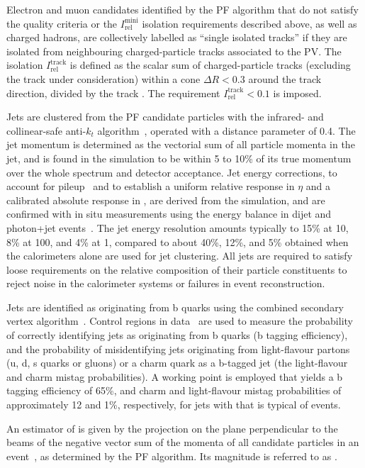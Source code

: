 Electron and muon candidates identified by the PF algorithm that do
not satisfy the quality criteria or the $I^\text{mini}_\text{rel}$
isolation requirements described above, as well as charged hadrons,
are collectively labelled as ``single isolated tracks'' if they are
isolated from neighbouring charged-particle tracks associated to the
PV. The isolation $I^\text{track}_\text{rel}$ is defined as the scalar
\Pt sum of charged-particle tracks (excluding the track under
consideration) within a cone $\Delta R < 0.3$ around the track
direction, divided by the track \Pt. The requirement
$I^\text{track}_\text{rel} < 0.1$ is imposed.

Jets are clustered from the PF candidate particles with the infrared-
and collinear-safe anti-$k_t$ algorithm~\cite{antikt}, operated with a
distance parameter of 0.4. The jet momentum is determined as the
vectorial sum of all particle momenta in the jet, and is found in the
simulation to be within 5 to 10\% of its true momentum over the whole
\pt spectrum and detector acceptance. Jet energy corrections, to
account for pileup~\cite{pileup} and to establish a uniform relative
response in $\eta$ and a calibrated absolute response in \Pt, are
derived from the simulation, and are confirmed with in situ
measurements using the energy balance in dijet and photon+jet
events~\cite{Chatrchyan:2011ds}. The jet energy resolution amounts
typically to 15\% at 10\GeV, 8\% at 100\GeV, and 4\% at 1\TeV,
compared to about 40\%, 12\%, and 5\% obtained when the calorimeters
alone are used for jet clustering.
All jets are required to satisfy loose requirements on the relative
composition of their particle constituents to reject noise in the
calorimeter systems or failures in event reconstruction.

Jets are identified as originating from b quarks using the combined
secondary vertex algorithm~\cite{CMS-PAS-BTV-12-001}. Control regions
in data~\cite{bjets} are used to measure the probability of correctly
identifying jets as originating from b quarks (b tagging efficiency),
and the probability of misidentifying jets originating from
light-flavour partons (u, d, s quarks or gluons) or a charm quark as a
b-tagged jet (the light-flavour and charm mistag probabilities). A
working point is employed that yields a b tagging efficiency of 65\%,
and charm and light-flavour mistag probabilities of approximately 12
and 1\%, respectively, for jets with \Pt that is typical of \ttbar
events.

An estimator of \ptvecmiss is given by the projection on the plane
perpendicular to the beams of the negative vector sum of the momenta
of all candidate particles in an event~\cite{cms-met}, as determined
by the PF algorithm. Its magnitude is referred to as \ETmiss.

